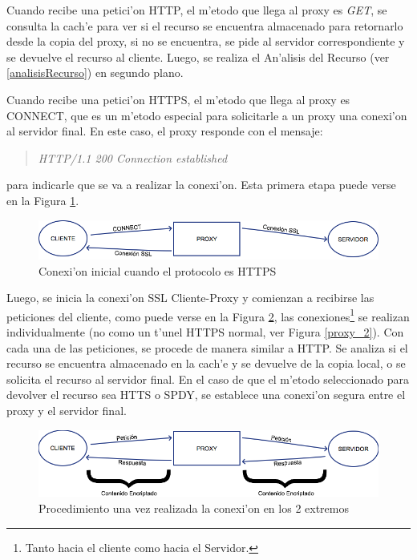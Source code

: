 Cuando recibe una petici'on HTTP, el m'etodo que llega al proxy es \textit{GET}, se consulta la cach'e para ver si el recurso se encuentra almacenado para retornarlo desde la copia del proxy, si no se encuentra, se pide al servidor correspondiente y se devuelve el recurso al cliente. Luego, se realiza el An'alisis del Recurso (ver \ref{analisisRecurso}) en segundo plano.

Cuando recibe una petici'on HTTPS, el m'etodo que llega al proxy es CONNECT, que es un m'etodo especial para solicitarle a un proxy una conexi'on al servidor final. En este caso, el proxy responde con el mensaje:
\begin{quote}
\textit{\textit{HTTP/1.1 200 Connection established}}
\end{quote}
para indicarle que se va a realizar la conexi'on. Esta primera etapa puede verse en la Figura \ref{mitm1}.

\begin{figure}[h]
  	\centering
	\includegraphics[width=\textwidth]{img/mitm1}
	\caption{\small Conexi'on inicial cuando el protocolo es HTTPS}
	\label{mitm1}
\end{figure}
\vspace{3cm}
Luego, se inicia la conexi'on SSL Cliente-Proxy y comienzan a recibirse las peticiones del cliente, como puede verse en la Figura \ref{mitm2}, las conexiones\footnote{Tanto hacia el cliente como hacia el Servidor.} se realizan individualmente (no como un t'unel HTTPS normal, ver Figura \ref{proxy_2}). Con cada una de las peticiones, se procede de manera similar a HTTP. Se analiza si el recurso se encuentra almacenado en la cach'e y se devuelve de la copia local, o se solicita el recurso al servidor final. En el caso de que el m'etodo seleccionado para devolver el recurso sea HTTS o SPDY, se establece una conexi'on segura entre el proxy y el servidor final.

\begin{figure}[h]
  	\centering
	\includegraphics[width=\textwidth]{img/mitm2}
	\caption{\small Procedimiento una vez realizada la conexi'on en los 2 extremos}
	\label{mitm2}
\end{figure}

